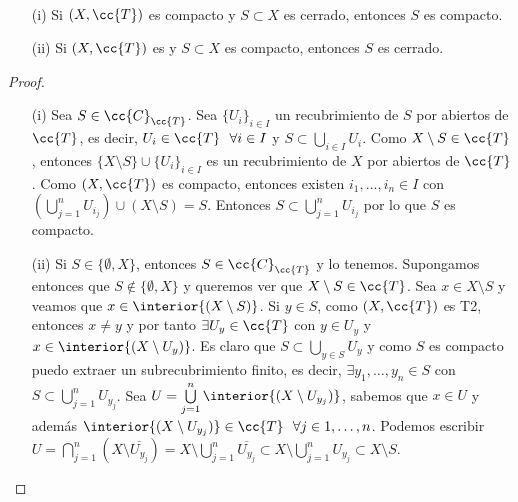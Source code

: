 \begin{prop}\
    \begin{enumerate}
        \item[(i)] Si $(X, \cc{T})$ es compacto y $S\subset X$ es cerrado, entonces $S$ es compacto.
        \item[(ii)] Si $(X, \cc{T})$ es \apuntar{T2} y $S\subset X$ es compacto, entonces $S$ es cerrado.
    \end{enumerate}

    \begin{proof}\
        \begin{enumerate}
            \item[(i)] Sea $S\in \cc{C}_{\cc{T}}$. Sea $\{U_i\}_{i\in I}$ un recubrimiento de $S$ por abiertos de $\cc{T}$, es decir, $U_i\in \cc{T}\ \ \forall i \in I$ y $S\subset \bigcup\limits_{i\in I}U_i$. Como $X\setminus S\in \cc{T}$, entonces $\{X\setminus S\}\cup\{U_i\}_{i\in I}$ es un recubrimiento de $X$ por abiertos de $\cc{T}$. Como $(X, \cc{T})$ es compacto, entonces existen $i_1,\dots,i_n\in I$ con $\left(\bigcup\limits_{j=1}^{n}U_{i_j}\right)\cup (X\setminus S)=S$. Entonces $S\subset \bigcup\limits_{j=1}^{n}U_{i_j}$ por lo que $S$ es compacto.
            \item[(ii)] Si $S\in \{\emptyset, X\}$, entonces $S\in \cc{C}_{\cc{T}}$ y lo tenemos. Supongamos entonces que $S\notin \{\emptyset, X\}$ y queremos ver que $X\setminus S\in \cc{T}$. Sea $x\in X\setminus S$ y veamos que $x\in \interior{(X\setminus S)}$. Si $y\in S$, como $(X, \cc{T})$ es T2, entonces $x\neq y$ y por tanto $\exists U_y\in \cc{T}$ con $y\in U_y$ y $x\in \interior{(X\setminus U_y)}$. Es claro que $S\subset \bigcup\limits_{y\in S}U_y$ y como $S$ es compacto puedo extraer un subrecubrimiento finito, es decir, $\exists y_1, \dots, y_n\in S$ con $S\subset \bigcup\limits_{j=1}^{n}U_{y_j}$. Sea $U=\bigcup\limits_{j=1}^{n}\interior{(X\setminus U_{y_j})}$, sabemos que $x\in U$ y además $\interior{(X\setminus U_{y_j})}\in \cc{T}\ \ \forall j\in 1,\dots,n$. Podemos escribir $U=\bigcap\limits_{j=1}^{n}(X\setminus \overline{U_{y_j}})=X\setminus \bigcup\limits_{j=1}^n \overline{U_{y_j}}\subset X\setminus \bigcup\limits_{j=1}^n U_{y_j} \subset X\setminus S$.
        \end{enumerate}
    \end{proof}
\end{prop}

